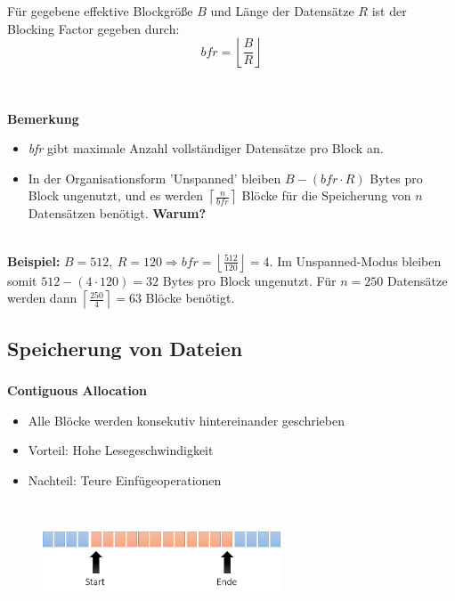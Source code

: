 \begin{frame}
\frametitle{\insertsection}
\framesubtitle{\insertsubsection}
\begin{definition}
	Für gegebene effektive Blockgr\"o\ss e $B$ und L\"ange der Datens\"atze $R$ ist der Blocking Factor gegeben durch:
	$$bfr = \left \lfloor \frac{B}{R}\right \rfloor$$
\end{definition}
\pause
\ \\[-18pt]
\begin{block}{\textbf{Bemerkung}}
	\begin{itemize}
		\item \textit{bfr} gibt maximale Anzahl vollst\"andiger Datens\"atze pro Block an.
		\item In der Organisationsform 'Unspanned' bleiben $B-(bfr \cdot R)$ Bytes pro Block ungenutzt, und es werden
		$\left \lceil \frac{n}{bfr}\right \rceil$ Bl\"ocke für die Speicherung von $n$ Datens\"atzen ben\"otigt. \textbf{Warum?}
	\end{itemize} 
\end{block}
\pause
\ \\[-8pt]
\textbf{Beispiel:}
$B=512,\ R=120 \Rightarrow bfr = \left\lfloor\frac{512}{120}\right\rfloor = 4$. Im Unspanned-Modus
bleiben somit $512-(4 \cdot 120)=32$ Bytes pro Block ungenutzt. F\"ur $n=250$ Datens\"atze werden 
dann $\left \lceil \frac{250}{4}\right \rceil = 63$ Bl\"ocke ben\"otigt.
\end{frame}

\subsection{Speicherung von Dateien}

\begin{frame}
\frametitle{\insertsection}
\framesubtitle{\insertsubsection}
\abs
\textbf{Contiguous Allocation}
	\begin{itemize}
		\item Alle Bl\"ocke werden konsekutiv hintereinander geschrieben
		\item Vorteil: Hohe Lesegeschwindigkeit
		\item Nachteil: Teure Einf\"ugeoperationen
	\end{itemize}\ \\[4pt]
\begin{figure}
	\includegraphics[width=200pt]{img/cont.png}
\end{figure}
\end{frame}

